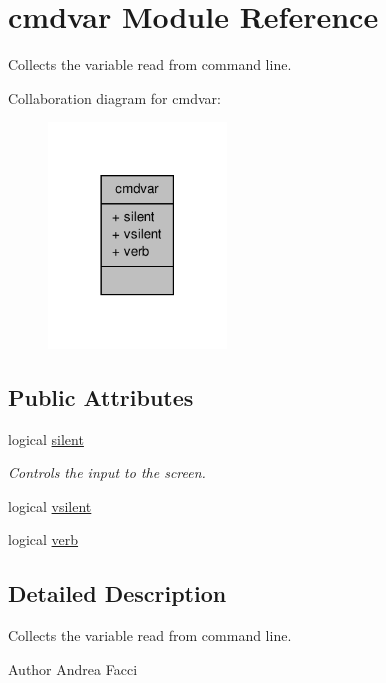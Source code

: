 \hypertarget{classcmdvar}{\section{cmdvar Module Reference}
\label{classcmdvar}
}


Collects the variable read from command line.  




Collaboration diagram for cmdvar\-:\nopagebreak
\begin{figure}[H]
\begin{center}
\leavevmode
\includegraphics[width=134pt]{classcmdvar__coll__graph}
\end{center}
\end{figure}
\subsection*{Public Attributes}
\begin{DoxyCompactItemize}
\item 
logical \hyperlink{classcmdvar_a774f2caff8f9563a52b69cf5c205da28}{silent}
\begin{DoxyCompactList}\small\item\em Controls the input to the screen. \end{DoxyCompactList}\item 
logical \hyperlink{classcmdvar_a5d5ef4d5f7d8f3ec8c8e390e0f594ec1}{vsilent}
\item 
logical \hyperlink{classcmdvar_ab46a1faddb3f0a3fe76bfa461154ffcc}{verb}
\end{DoxyCompactItemize}


\subsection{Detailed Description}
Collects the variable read from command line. \begin{DoxyAuthor}{Author}
Andrea Facci 
\end{DoxyAuthor}


